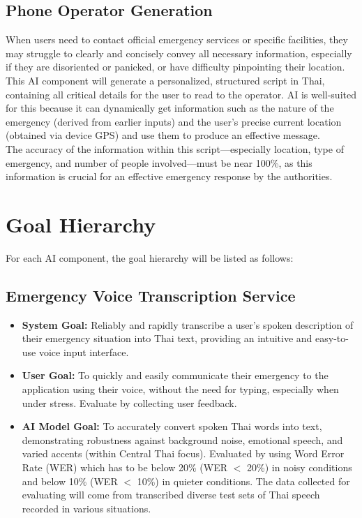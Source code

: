 \subsection{Phone Operator Generation}
\label{subsec:ai_comp_phone_operator}
When users need to contact official emergency services or specific facilities, they may struggle to clearly and concisely convey all necessary information, especially if they are disoriented or panicked, or have difficulty pinpointing their location.\\
\indent This AI component will generate a personalized, structured script in Thai, containing all critical details for the user to read to the operator. AI is well-suited for this because it can dynamically get information such as the nature of the emergency (derived from earlier inputs) and the user's precise current location (obtained via device GPS) and use them to produce an effective message.\\
\indent The accuracy of the information within this script—especially location, type of emergency, and number of people involved—must be near 100\%, as this information is crucial for an effective emergency response by the authorities.


\section{Goal Hierarchy}
\label{sec:goal_hierarchy}
For each AI component, the goal hierarchy will be listed as follows:

\subsection{Emergency Voice Transcription Service}
\label{subsec:goal_voice_transcription}
\begin{itemize}
    \item \textbf{System Goal:} Reliably and rapidly transcribe a user's spoken description of their emergency situation into Thai text, providing an intuitive and easy-to-use voice input interface.
    \item \textbf{User Goal:} To quickly and easily communicate their emergency to the application using their voice, without the need for typing, especially when under stress. Evaluate by collecting user feedback.
    \item \textbf{AI Model Goal:} To accurately convert spoken Thai words into text, demonstrating robustness against background noise, emotional speech, and varied accents (within Central Thai focus). Evaluated by using Word Error Rate (WER) which has to be below 20\% (WER $<$ 20\%) in noisy conditions and below 10\% (WER $<$ 10\%) in quieter conditions. The data collected for evaluating will come from transcribed diverse test sets of Thai speech recorded in various situations.
\end{itemize}

